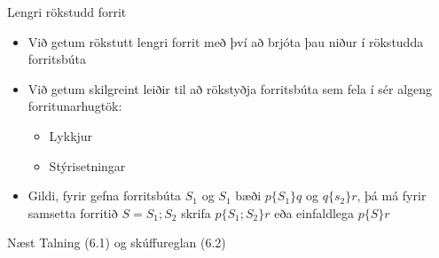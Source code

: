 \documentclass{beamer}
\begin{document}
\begin{frame}{Lengri rökstudd forrit}
\begin{itemize}
 \item Við getum rökstutt lengri forrit með því að brjóta þau niður í rökstudda forritsbúta
 \item Við getum skilgreint leiðir til að rökstyðja forritsbúta sem fela í sér algeng forritunarhugtök:
 \begin{itemize}
  \item Lykkjur
  \item Stýrisetningar
 \end{itemize}
 \item Gildi, fyrir gefna forritsbúta $S_1$ og $S_1$ bæði $p\{S_1\}q$ og $q\{s_2\}r$, þá má fyrir samsetta forritið $S = S_1;S_2$ skrifa $p\{S_1; S_2\}r$ eða einfaldlega $p\{S\}r$
\end{itemize}
\end{frame}


\begin{frame}{Næst}
Talning (6.1) og skúffureglan (6.2)
\end{frame}
\end{document}
